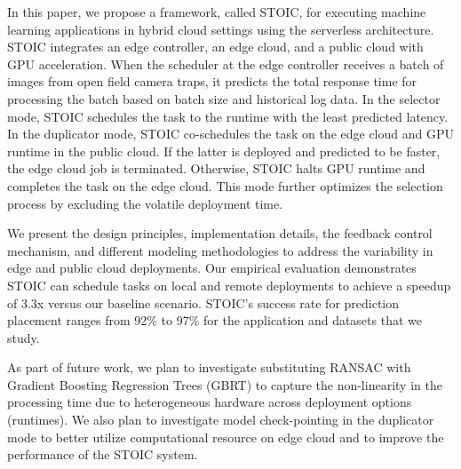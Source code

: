 In this paper, we propose a framework, called STOIC, for executing machine learning applications in hybrid cloud settings using the serverless architecture. STOIC integrates an edge controller, an edge cloud, and a public cloud with GPU acceleration. When the scheduler at the edge controller receives a batch of images from open field camera traps, it predicts the total response time for processing the batch based on batch size and historical log data. In the selector mode, STOIC schedules the task to the runtime with the least predicted latency. In the duplicator mode, STOIC co-schedules the task on the edge cloud and GPU runtime in the public cloud. If the latter is deployed and predicted to be faster, the edge cloud job is terminated. Otherwise, STOIC halts GPU runtime and completes the task on the edge cloud. This mode further optimizes the selection process by excluding the volatile deployment time.

We present the design principles, implementation details, the feedback control mechanism, and different modeling methodologies to address the variability in edge and public cloud deployments. Our empirical evaluation demonstrates STOIC can schedule tasks on local and remote deployments to achieve a speedup of 3.3x versus our baseline scenario. STOIC's success rate for prediction placement  ranges from 92\% to 97\% for the application and datasets that we study. 

As part of future work, we plan to investigate substituting RANSAC with Gradient Boosting Regression Trees (GBRT) to capture the non-linearity in the processing time due to heterogeneous hardware across deployment options (runtimes). We also plan to investigate model check-pointing in the duplicator mode to better utilize computational resource on edge cloud and to improve the performance of the STOIC system.